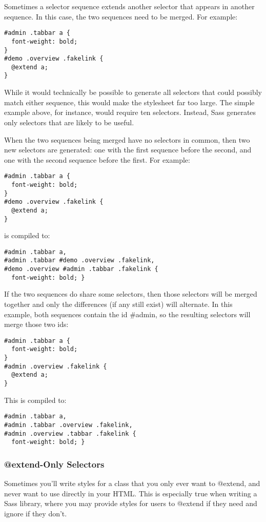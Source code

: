 \documentclass[10pt]{article}
\begin{document}
 Sometimes a selector sequence extends another selector that appears in another sequence. In this case, the two sequences need to be merged. For example:
\begin{verbatim}
#admin .tabbar a {
  font-weight: bold;
}
#demo .overview .fakelink {
  @extend a;
}
\end{verbatim}


 While it would technically be possible to generate all selectors that could possibly match either sequence, this would make the stylesheet far too large. The simple example above, for instance, would require ten selectors. Instead, Sass generates only selectors that are likely to be useful.


 When the two sequences being merged have no selectors in common, then two new selectors are generated: one with the first sequence before the second, and one with the second sequence before the first. For example:
\begin{verbatim}
#admin .tabbar a {
  font-weight: bold;
}
#demo .overview .fakelink {
  @extend a;
}
\end{verbatim}


 is compiled to:
\begin{verbatim}
#admin .tabbar a,
#admin .tabbar #demo .overview .fakelink,
#demo .overview #admin .tabbar .fakelink {
  font-weight: bold; }
\end{verbatim}


 If the two sequences do share some selectors, then those selectors will be merged together and only the differences (if any still exist) will alternate. In this example, both sequences contain the id \#admin, so the resulting selectors will merge those two ids:
\begin{verbatim}
#admin .tabbar a {
  font-weight: bold;
}
#admin .overview .fakelink {
  @extend a;
}
\end{verbatim}


 This is compiled to:
\begin{verbatim}
#admin .tabbar a,
#admin .tabbar .overview .fakelink,
#admin .overview .tabbar .fakelink {
  font-weight: bold; }
\end{verbatim}
\subsubsection{@extend-Only Selectors}


 Sometimes you’ll write styles for a class that you only ever want to @extend, and never want to use directly in your HTML. This is especially true when writing a Sass library, where you may provide styles for users to @extend if they need and ignore if they don’t.
\end{document}
